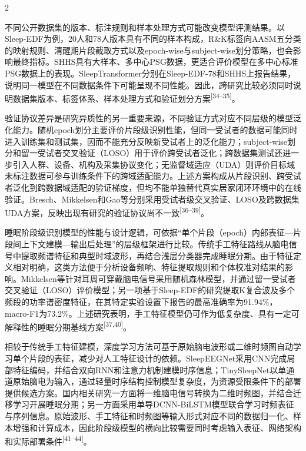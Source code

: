 \documentclass[UTF8,zihao=5,fontset=none]{ctexart}
\newcommand{\song}{\CJKfamily{song}}
\newcommand{\levelthree}[1]{%
  \par\noindent{\song\fontsize{10.5pt}{15.6pt}\selectfont #1}}
\newcommand{\refcite}[1]{\nolinebreak[4]\textsuperscript{[#1]}}
\begin{document}
\begin{multicols}{2}

不同公开数据集的版本、标注规则和样本处理方式可能改变模型评测结果。以Sleep-EDF为例，20人和78人版本具有不同的样本构成，R\&K标签向AASM五分类的映射规则、清醒期片段截取方式以及epoch-wise与subject-wise划分策略，也会影响最终指标。SHHS具有大样本、多中心PSG数据，更适合评价模型在多中心标准PSG数据上的表现。SleepTransformer分别在Sleep-EDF-78和SHHS上报告结果，说明同一模型在不同数据条件下可能呈现不同性能。因此，跨研究比较必须同时说明数据集版本、标签体系、样本处理方式和验证划分方案\refcite{34--35}。\par

验证协议差异是研究异质性的另一重要来源，不同验证方式对应不同层级的模型泛化能力。随机epoch划分主要评价片段级识别性能，但同一受试者的数据可能同时进入训练集和测试集，因而不能充分反映新受试者上的泛化能力；subject-wise划分和留一受试者交叉验证（LOSO）用于评价跨受试者泛化；跨数据集测试还进一步引入人群、设备、机构及采集协议变化；无监督域适应（UDA）则评价目标域未标注数据可参与训练条件下的跨域适配能力。上述方案构成从片段识别、跨受试者泛化到跨数据域适配的验证梯度，但均不能单独替代真实居家闭环环境中的在线验证。Bresch、Mikkelsen和Gao等分别采用受试者级交叉验证、LOSO及跨数据集UDA方案，反映出现有研究的验证协议尚不一致\refcite{36--39}。\par

\levelthree{2.2.3 阶段级表征与上下文模型}
睡眠阶段级识别模型的性能与设计逻辑，可依据“单个片段（epoch）内部表征—片段间上下文建模—输出后处理”的层级框架进行比较。传统手工特征路线从脑电信号中提取频谱特征和典型时域波形，再结合浅层分类器完成睡眠分期。由于特征定义相对明确，这类方法便于分析设备频响、特征提取规则和个体校准对结果的影响。Mikkelsen等针对耳周可穿戴脑电信号采用随机森林模型，并通过留一受试者交叉验证（LOSO）评价模型；另一项基于Sleep-EDF的研究提取K复合波及多个频段的功率谱密度特征，在其特定实验设置下报告的最高准确率为91.94\%，macro-F1为73.2\%。上述研究表明，手工特征模型仍可作为低复杂度、具有一定可解释性的睡眠分期基线方案\refcite{37,40}。\par

相较于传统手工特征建模，深度学习方法可基于原始脑电波形或二维时频图自动学习单个片段的表征，减少对人工特征设计的依赖。SleepEEGNet采用CNN完成局部特征编码，并结合双向RNN和注意力机制建模时序信息；TinySleepNet以单通道原始脑电为输入，通过轻量时序结构控制模型复杂度，为资源受限条件下的部署提供候选方案。国内相关研究一方面将一维脑电信号转换为二维时频图，并结合迁移学习开展睡眠分期；另一方面采用单导DCNN-BiLSTM模型联合学习时频表征与序列信息。原始波形、手工特征和时频图等输入形式对应不同的数据归一化、样本增强和计算成本，因此阶段级模型的横向比较需要同时考虑输入表征、网络架构和实际部署条件\refcite{41--44}。\par


\end{multicols}
\end{document}

